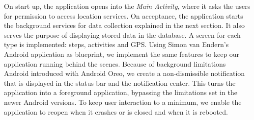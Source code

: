 On start up, the application opens into the \textit{Main Activity}, where it asks the users for permission to access location services. On acceptance, the application starts the background services for data collection explained in the next section. It also serves the purpose of displaying stored data in the database. A screen for each type is implemented: steps, activities and GPS. Using Simon van Endern's Android application as blueprint, we implement the same features to keep our application running behind the scenes. Because of background limitations Android introduced with Android Oreo, we create a non-dismissible notification that is displayed in the status bar and the notification center. This turns the application into a foreground application, bypassing the limitations set in the newer Android versions. To keep user interaction to a minimum, we enable the application to reopen when it crashes or is closed and when it is rebooted.

